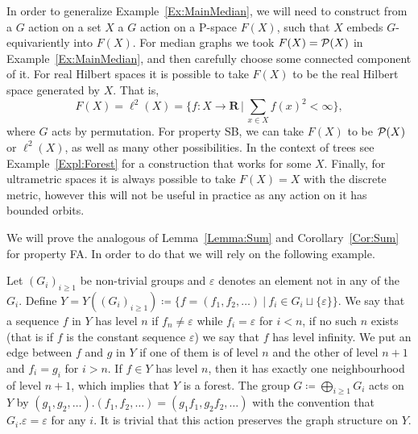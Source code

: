 In order to generalize Example~\ref{Ex:MainMedian}, we will need to construct from a $G$ action on a set $X$ a $G$ action on a P-space $F(X)$,
such that $X$ embeds $G$-equivariently into $F(X)$.
For median graphs we took $F(X)=\mathcal P(X)$ in Example~\ref{Ex:MainMedian}, and then carefully choose some connected component of it.
For real Hilbert spaces it is possible to take $F(X)$ to be the real Hilbert space generated by $X$. That is, 
\[F(X)=\ell^2(X)=\bigg\{f\colon X\to \mathbf R\,\bigg|\, \sum_{x\in X}f(x)^2<\infty\bigg\},\]
where $G$ acts by permutation.
For property SB, we can take $F(X)$ to be  $\mathcal P(X)$ or $\ell^2(X)$, as well as many other possibilities.
In the context of trees see Example~\ref{Expl:Forest} for a construction that works for some $X$.
Finally, for ultrametric spaces it is always possible to take $F(X)=X$ with the discrete metric, however this will not be useful in practice as any action on it has bounded orbits.

We will prove the analogous of Lemma~\ref{Lemma:Sum} and Corollary~\ref{Cor:Sum} for property FA.
In order to do that we will rely on the following example.
\begin{exmp}\label{Expl:Forest}
Let $(G_i)_{i\geq 1}$ be non-trivial groups and $\varepsilon$ denotes an element not in any of the $G_i$.
Define $Y=Y((G_i)_{i\geq 1})\coloneqq\{f=(f_1,f_2,\dots)\ |\ f_i\in G_i\sqcup\{\varepsilon\}\}$.
We say that a sequence $f$ in $Y$ has level $n$ if $f_n\neq\varepsilon$ while $f_i=\varepsilon$ for $i<n$, if no such $n$ exists (that is if $f$ is the constant sequence $\varepsilon$) we say that $f$ has level infinity.
We put an edge between $f$ and $g$ in $Y$ if one of them is of level $n$ and the other of level $n+1$ and $f_i=g_i$ for $i>n$.
If $f\in Y$ has level $n$, then it has exactly one neighbourhood of level $n+1$, which implies that $Y$ is a forest.
The group $G\coloneqq\bigoplus_{i\geq 1}G_i$ acts on $Y$ by $(g_1,g_2,\dots).(f_1,f_2,\dots)=(g_1f_1,g_2f_2,\dots)$ with the convention that $G_i.\varepsilon=\varepsilon$ for any $i$.
It is trivial that this action preserves the graph structure on $Y$.
\end{exmp}

